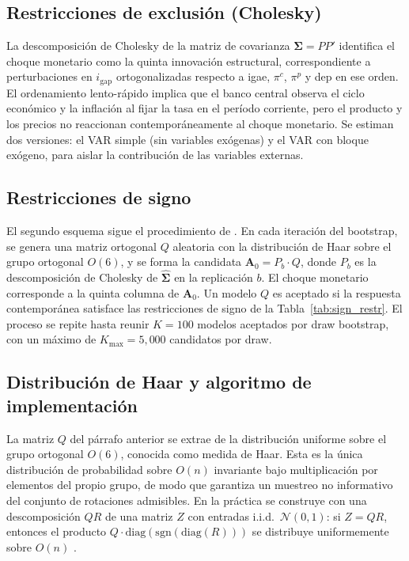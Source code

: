 \documentclass[12pt,a4paper]{article}
\begin{document}
\subsection{Restricciones de exclusión (Cholesky)}

La descomposición de Cholesky de la matriz de covarianza $\boldsymbol{\Sigma} = PP'$
identifica el choque monetario como la quinta innovación estructural, correspondiente
a perturbaciones en $i_{\text{gap}}$ ortogonalizadas respecto a igae, $\pi^c$, $\pi^p$
y dep en ese orden.
El ordenamiento lento-rápido implica que el banco central observa el ciclo económico y
la inflación al fijar la tasa en el período corriente, pero el producto y los precios
no reaccionan contemporáneamente al choque monetario.
Se estiman dos versiones: el VAR simple (sin variables exógenas) y el VAR con bloque
exógeno, para aislar la contribución de las variables externas.

\subsection{Restricciones de signo}

El segundo esquema sigue el procedimiento de \citet{uhlig2005}.
En cada iteración del bootstrap, se genera una matriz ortogonal $Q$ aleatoria con la
distribución de Haar sobre el grupo ortogonal $O(6)$, y se forma la candidata
$\mathbf{A}_0 = P_b \cdot Q$, donde $P_b$ es la descomposición de Cholesky de
$\widehat{\boldsymbol{\Sigma}}$ en la replicación $b$.
El choque monetario corresponde a la quinta columna de $\mathbf{A}_0$.
Un modelo $Q$ es aceptado si la respuesta contemporánea satisface las restricciones de
signo de la Tabla~\ref{tab:sign_restr}.
El proceso se repite hasta reunir $K = 100$ modelos aceptados por draw bootstrap,
con un máximo de $K_{\max} = 5{,}000$ candidatos por draw.

\subsection{Distribución de Haar y algoritmo de implementación}

La matriz $Q$ del párrafo anterior se extrae de la distribución uniforme sobre el grupo
ortogonal $O(6)$, conocida como medida de Haar. Esta es la única distribución de
probabilidad sobre $O(n)$ invariante bajo multiplicación por elementos del propio grupo,
de modo que garantiza un muestreo no informativo del conjunto de rotaciones admisibles.
En la práctica se construye con una descomposición $QR$ de una matriz $Z$ con entradas
i.i.d.\ $\mathcal{N}(0,1)$: si $Z = Q R$, entonces el producto
$Q \cdot \mathrm{diag}(\mathrm{sgn}(\mathrm{diag}(R)))$ se distribuye uniformemente sobre
$O(n)$ \citep[véase][]{mountforduhlig2009}.
\end{document}
